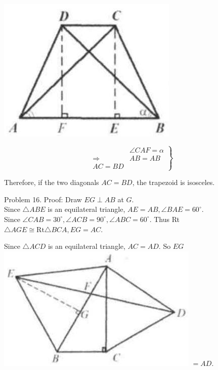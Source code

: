 \documentclass[10pt]{article}
\begin{document}
\begin{center}
\includegraphics[max width=\textwidth]{2025_04_17_97bc1f7e44d93c271a88g-097}
\end{center}


\[
\left.\begin{array}{rl} 
& \angle C A F=\alpha \\
\Rightarrow & A B=A B \\
A C=B D
\end{array}\right\}
\]

Therefore, if the two diagonals \(A C=B D\), the trapezoid is isosceles.

Problem 16. Proof:
Draw \(E G \perp A B\) at \(G\).\\
Since \(\triangle A B E\) is an equilateral triangle, \(A E=A B, \angle B A E=60^{\circ}\).\\
Since \(\angle C A B=30^{\circ}, \angle A C B=90^{\circ}, \angle A B C=60^{\circ}\). Thus Rt \(\triangle A G E \cong \mathrm{Rt} \triangle B C A, E G=A C\).

Since \(\triangle A C D\) is an equilateral triangle, \(A C=A D\). So \(E G\)\\
\includegraphics[max width=\textwidth]{2025_04_17_97bc1f7e44d93c271a88g-098} \(=A D\).
\end{document}
